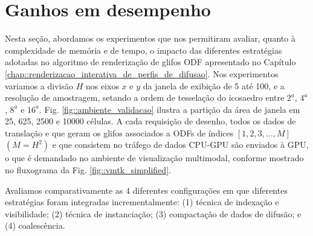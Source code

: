 \section{Ganhos em desempenho}
\label{sec::funcionalidades_agregadas_e_ganhos_de_performance}

Nesta seção, abordamos os experimentos que nos permitiram avaliar, quanto à complexidade de memória e de tempo, o impacto das diferentes estratégias adotadas no algoritmo de renderização de glifos ODF apresentado no Capítulo \ref{chap::renderizacao_interativa_de_perfis_de_difusao}.
Nos experimentos variamos a divisão $H$ nos eixos $x$ e $y$ da janela de exibição de 5 até 100, e a resolução de amostragem, setando a ordem de tesselação do icosaedro entre $2^a$, $4^a$, $8^a$ e $16^a$. Fig. \ref{fig::ambiente_validacao} ilustra a partição da área de janela em 25, 625, 2500 e 10000 células. A cada requisição de desenho, todos os dados de translação e que geram os glifos associados a ODFs de índices $[1, 2, 3, ..., M]$ $(M = H^2)$ e que consistem no tráfego de dados CPU-GPU são enviados à GPU, o que é demandado no ambiente de visualização multimodal, conforme mostrado no fluxograma da Fig. \ref{fig::vmtk_simplified}.

 Avaliamos comparativamente as 4 diferentes configurações em que diferentes estratégias foram integradas incrementalmente: (1) técnica de indexação e visibilidade; (2) técnica de instanciação; (3) compactação de dados de difusão; e (4) coalescência.
 



